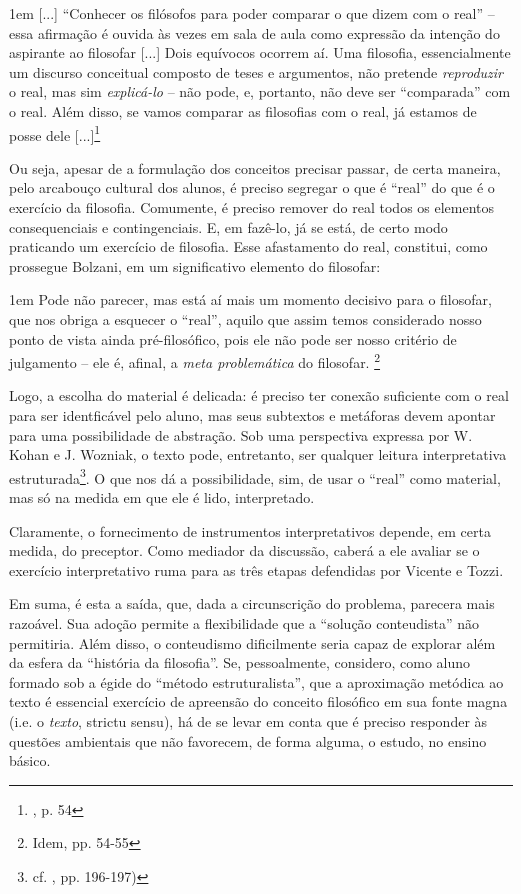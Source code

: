 \documentclass[12pt,a4paper]{article}
\newenvironment{citac}{
	\begin{addmargin}[4cm]{1em} \footnotesize}{\normalfont \end{addmargin}
}
\begin{document}
	\begin{citac}
		[...] “Conhecer os filósofos para poder comparar o que 
		dizem com o real” -- essa afirmação é ouvida às vezes 
		em sala de aula como expressão da intenção do aspirante 
		ao filosofar [...] Dois equívocos ocorrem aí. Uma 
		filosofia, essencialmente um discurso conceitual composto 
		de teses e argumentos, não pretende \emph{reproduzir} o 
		real, mas sim \emph{explicá-lo} -- não pode, e, portanto, 
		não deve ser “comparada” com o real. Além disso, se vamos 
		comparar as filosofias com o real, já estamos de posse dele
		[...]\footnote{\cite{bolzani}, p. 54}
	\end{citac}

	Ou seja, apesar de a formulação dos conceitos precisar passar, 
	de certa maneira, pelo arcabouço cultural dos alunos, é preciso 
	segregar o que é “real” do que é o exercício da filosofia. 
	Comumente, é preciso remover do real todos os elementos 
	consequenciais e contingenciais. E, em fazê-lo, já se está, de 
	certo modo praticando um exercício de filosofia. Esse afastamento 
	do real, constitui, como prossegue Bolzani, em um significativo 
	elemento do filosofar: 
	
	\begin{citac}
		Pode não parecer, mas está aí mais um momento decisivo para o 
		filosofar, que nos obriga a esquecer o “real”, aquilo que 
		assim temos considerado nosso ponto de vista ainda 
		pré-filosófico, pois ele não pode ser nosso critério de 
		julgamento -- ele é, afinal, a \emph{meta problemática} do 
		filosofar. \footnote{Idem, pp. 54-55}
	\end{citac}

	Logo, a escolha do material é delicada: é preciso ter conexão 
	suficiente com o real para ser identficável pelo aluno, mas seus 
	subtextos e metáforas devem apontar para uma possibilidade de 
	abstração. Sob uma perspectiva expressa por W. Kohan e J. Wozniak, 
	o texto pode, entretanto, ser qualquer leitura interpretativa 
	estruturada\footnote{cf. \cite{wozkoh}, pp. 196-197)}. O que 
	nos dá a possibilidade, sim, de usar o “real” como material, mas 
	só na medida em que ele é lido, interpretado. 

	Claramente, o fornecimento de instrumentos interpretativos depende, 
	em certa medida, do preceptor. Como mediador da discussão, caberá 
	a ele avaliar se o exercício interpretativo ruma para as três 
	etapas defendidas por Vicente e Tozzi. 

	Em suma, é esta a saída, que, dada a circunscrição do problema, 
	parecera mais razoável. Sua adoção permite a flexibilidade que 
	a “solução conteudista” não permitiria. Além disso, o conteudismo 
	dificilmente seria capaz de explorar além da esfera da “história 
	da filosofia”. Se, pessoalmente, considero, como aluno formado 
	sob a égide do “método estruturalista”, que a aproximação metódica 
	ao texto é essencial exercício de apreensão do conceito filosófico 
	em sua fonte magna (i.e. o \emph{texto}, strictu sensu), há de se 
	levar em conta que é preciso responder às questões ambientais 
	que não favorecem, de forma alguma, o estudo, no ensino básico. 
\end{document}
